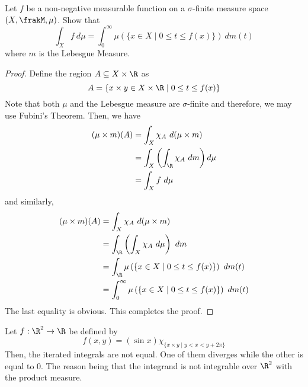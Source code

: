 \begin{example}
    Let $f$ be a non-negative measurable function on a $\sigma$-finite measure space $(X,\frakM,\mu)$. Show that 
    \begin{equation*}
        \int_X f~d\mu = \int_0^\infty\mu\left(\{x\in X\mid 0\le t\le f(x)\}\right)~dm(t)
    \end{equation*}
    where $m$ is the Lebesgue Measure.
\end{example}
\begin{proof}
    Define the region $A\subseteq X\times\R$ as
    \begin{equation*}
        A = \{x\times y\in X\times\R\mid 0\le t\le f(x)\}
    \end{equation*}
    Note that both $\mu$ and the Lebesgue measure are $\sigma$-finite and therefore, we may use Fubini's Theorem. Then, we have 
    \begin{align*}
        (\mu\times m)(A) &= \int_X\chi_A~d(\mu\times m)\\
        &= \int_X\left(\int_{\R}\chi_A~dm\right)d\mu\\
        &= \int_X f~d\mu
    \end{align*}
    and similarly, 
    \begin{align*}
        (\mu\times m)(A) &= \int_X\chi_A~d(\mu\times m)\\
        &= \int_{\R}\left(\int_X\chi_A~d\mu\right)~dm\\
        &= \int_{\R}\mu\left(\{x\in X\mid 0\le t\le f(x)\}\right)~dm(t)\\
        &= \int_0^\infty\mu\left(\{x\in X\mid 0\le t\le f(x)\}\right)~dm(t)
    \end{align*}
    The last equality is obvious. This completes the proof.
\end{proof}

\begin{example}
    Let $f:\R^2\to\R$ be defined by 
    \begin{equation*}
        f(x,y) = (\sin x)\chi_{\{x\times y\mid y < x < y + 2\pi\}}
    \end{equation*}
    Then, the iterated integrals are not equal. One of them diverges while the other is equal to $0$. The reason being that the integrand is not integrable over $\R^2$ with the product measure.
\end{example}